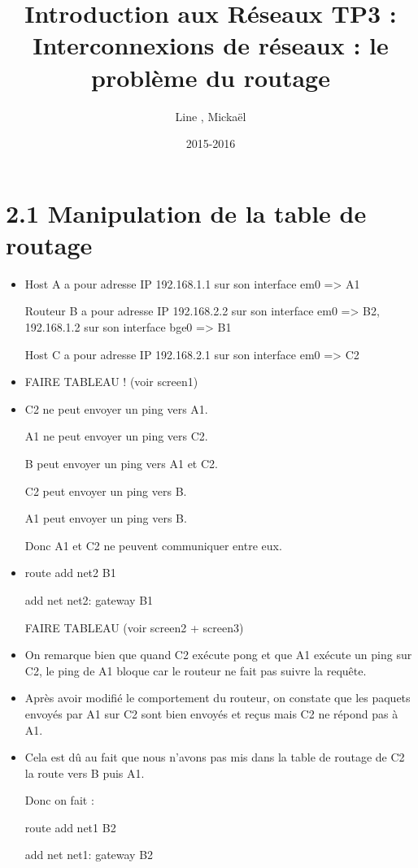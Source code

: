 \documentclass{article}
\title{Introduction aux Réseaux TP3 : \\ Interconnexions de réseaux : le problème du routage}
\author{Line \bsc{POUVARET}, Mickaël \bsc{TURNEL}}
\date{2015-2016}
\begin{document}
\maketitle

\section*{2.1 Manipulation de la table de routage}

\begin{itemize}\renewcommand{\labelitemi}{$\bullet$}
\item Host A a pour adresse IP 192.168.1.1 sur son interface em0 => A1

Routeur B a pour adresse IP 192.168.2.2 sur son interface em0 => B2, 192.168.1.2 sur son interface bge0 => B1

Host C a pour adresse IP 192.168.2.1 sur son interface em0 => C2
\item FAIRE TABLEAU ! (voir screen1)

\item C2 ne peut envoyer un ping vers A1.

A1 ne peut envoyer un ping vers C2.

B peut envoyer un ping vers A1 et C2.

C2 peut envoyer un ping vers B.

A1 peut envoyer un ping vers B.

Donc A1 et C2 ne peuvent communiquer entre eux.

\item route add net2 B1

add net net2: gateway B1

FAIRE TABLEAU (voir screen2 + screen3)

\item On remarque bien que quand C2 exécute pong et que A1 exécute un ping sur C2, le ping de A1 bloque car le routeur ne fait pas suivre la requête.

\item Après avoir modifié le comportement du routeur, on constate que les paquets envoyés par A1 sur C2 sont bien envoyés et reçus mais C2 ne répond pas à A1.

\item Cela est dû au fait que nous n'avons pas mis dans la table de routage de C2 la route vers B puis A1.

Donc on fait :

route add net1 B2

add net net1: gateway B2


\end{itemize}
\end{document}
